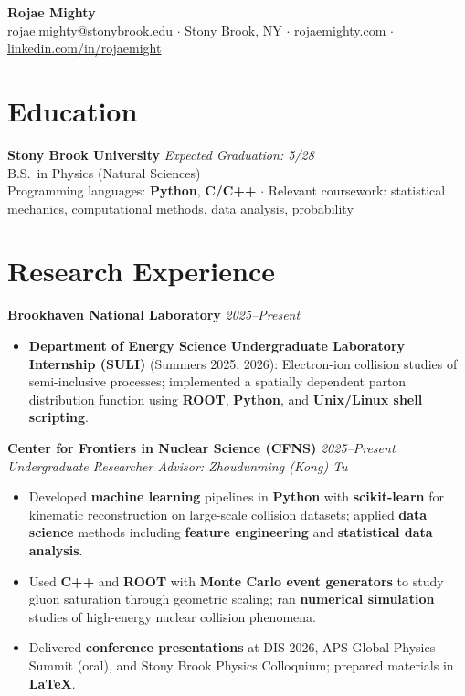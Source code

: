 \documentclass[11pt,letterpaper]{article}
\newcommand{\header}[1]{{\LARGE\bfseries #1}}
\newcommand{\lineitem}[2]{%
  \textbf{#1} \hfill \textit{#2}\\[-2pt]
}
\newcommand{\subheader}[1]{\textit{#1}\\[2pt]}
\newcommand{\cvitem}[1]{\item #1}
\begin{document}
\header{Rojae Mighty}\\[2pt]
\href{mailto:rojae.mighty@stonybrook.edu}{rojae.mighty@stonybrook.edu} \quad$\cdot$\quad
Stony Brook, NY \quad$\cdot$\quad
\href{https://rojaemighty.com}{rojaemighty.com} \quad$\cdot$\quad
\href{https://www.linkedin.com/in/rojaemight/}{linkedin.com/in/rojaemight}

\section{Education}
\lineitem{Stony Brook University}{Expected Graduation: 5/28}
B.S.\ in Physics (Natural Sciences)\\
Programming languages: \textbf{Python}, \textbf{C/C++} \quad$\cdot$\quad
Relevant coursework: statistical mechanics, computational methods, data analysis, probability

\section{Research Experience}

\lineitem{Brookhaven National Laboratory}{2025--Present}
\begin{itemize}
  \cvitem{\textbf{Department of Energy Science Undergraduate Laboratory Internship (SULI)} (Summers 2025, 2026): Electron-ion collision studies of semi-inclusive processes; implemented a spatially dependent parton distribution function using \textbf{ROOT}, \textbf{Python}, and \textbf{Unix/Linux shell scripting}.}
\end{itemize}

\lineitem{Center for Frontiers in Nuclear Science (CFNS)}{2025--Present}
\subheader{Undergraduate Researcher \quad Advisor: Zhoudunming (Kong) Tu}
\begin{itemize}
  \cvitem{Developed \textbf{machine learning} pipelines in \textbf{Python} with \textbf{scikit-learn} for kinematic reconstruction on large-scale collision datasets; applied \textbf{data science} methods including \textbf{feature engineering} and \textbf{statistical data analysis}.}
  \cvitem{Used \textbf{C++} and \textbf{ROOT} with \textbf{Monte Carlo event generators} to study gluon saturation through geometric scaling; ran \textbf{numerical simulation} studies of high-energy nuclear collision phenomena.}
  \cvitem{Delivered \textbf{conference presentations} at DIS 2026, APS Global Physics Summit (oral), and Stony Brook Physics Colloquium; prepared materials in \textbf{LaTeX}.}
\end{itemize}
\end{document}
